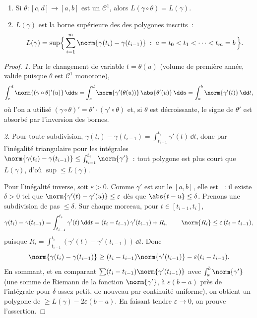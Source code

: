 \begin{theorem}\label{thm:b2:curves:lengthinv}
\leavevmode
\begin{enumerate}
\item Si $\theta \colon [c, d] \to [a, b]$ est un  $\mathcal{C}^1$, alors $L(\gamma \circ \theta) = L(\gamma)$.
\item $L(\gamma)$ est la borne supérieure des  des
polygones inscrits~:
\[
L(\gamma)
= \sup\Bigl\{\, \sum_{i=1}^{m} \norm{\gamma(t_i) -
\gamma(t_{i-1})} \;:\; a = t_0 < t_1 < \dots < t_m = b \,\Bigr\}.
\]
\end{enumerate}
\end{theorem}

\begin{proof}
\emph{1.} Par le changement de variable $t = \theta(u)$ (volume
de première année, valide puisque $\theta$ est $\mathcal{C}^1$
monotone),
\[
\int_c^d \norm{(\gamma\circ\theta)'(u)}\,\dd u
= \int_c^d \norm{\gamma'(\theta(u))}\,\abs{\theta'(u)}\,\dd u
= \int_a^b \norm{\gamma'(t)}\,\dd t ,
\]
où l'on a utilisé $(\gamma\circ\theta)' = \theta'\cdot
(\gamma'\circ\theta)$ et, si $\theta$ est décroissante, le signe de
$\theta'$ est absorbé par l'inversion des bornes.

\emph{2.} Pour toute subdivision, $\gamma(t_i) - \gamma(t_{i-1}) =
\int_{t_{i-1}}^{t_i}\gamma'(t)\,\dd t$, donc par l'inégalité
triangulaire pour les intégrales $\norm{\gamma(t_i) - \gamma(t_{i-1})}
\leq \int_{t_{i-1}}^{t_i}\norm{\gamma'}$~: tout polygone est plus
court que $L(\gamma)$, d'où $\sup \leq L(\gamma)$.

Pour l'inégalité inverse, soit $\varepsilon > 0$. Comme $\gamma'$
est  sur le  $[a,b]$, elle est 
~: il existe $\delta > 0$ tel que $\norm{\gamma'(t) -
\gamma'(u)} \leq \varepsilon$ dès que $\abs{t - u} \leq \delta$.
Prenons une subdivision de pas $\leq \delta$. Sur chaque morceau,
pour $t \in [t_{i-1}, t_i]$,
\[
\gamma(t_i) - \gamma(t_{i-1})
= \int_{t_{i-1}}^{t_i}\gamma'(t)\,\dd t
= (t_i - t_{i-1})\,\gamma'(t_{i-1}) + R_i,
\qquad
\norm{R_i} \leq \varepsilon\,(t_i - t_{i-1}),
\]
puisque $R_i = \int_{t_{i-1}}^{t_i}(\gamma'(t) -
\gamma'(t_{i-1}))\,\dd t$. Donc
\[
\norm{\gamma(t_i) - \gamma(t_{i-1})}
\geq (t_i - t_{i-1})\norm{\gamma'(t_{i-1})}
- \varepsilon (t_i - t_{i-1}) .
\]
En sommant, et en comparant $\sum (t_i -
t_{i-1})\norm{\gamma'(t_{i-1})}$ avec $\int_a^b\norm{\gamma'}$ (une
somme de Riemann de la fonction  $\norm{\gamma'}$, à
$\varepsilon(b - a)$ près de l'intégrale pour $\delta$ assez petit,
de nouveau par continuité uniforme), on obtient un polygone de
 $\geq L(\gamma) - 2\varepsilon(b - a)$. En faisant tendre
$\varepsilon \to 0$, on prouve l'assertion.
\end{proof}

